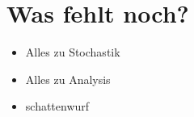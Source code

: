 \chapter{Was fehlt noch?}
\begin{itemize}
    \item Alles zu Stochastik
    \item Alles zu Analysis
    \item schattenwurf
\end{itemize}
